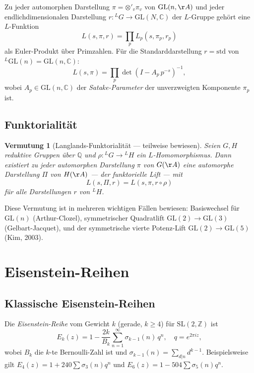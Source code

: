 \documentclass[12pt,a4paper]{amsart}
\newtheorem{conjecture}[theorem]{Vermutung}
\theoremstyle{definition}
\newcommand{\ZZ}{\mathbb{Z}}
\newcommand{\QQ}{\mathbb{Q}}
\newcommand{\CC}{\mathbb{C}}
\newcommand{\GL}{\mathrm{GL}}
\newcommand{\SL}{\mathrm{SL}}
\begin{document}
Zu jeder automorphen Darstellung $\pi = \otimes'_v \pi_v$ von $\GL(n,\AA)$ und
jeder endlichdimensionalen Darstellung $r: {}^L G \to \GL(N,\CC)$ der $L$-Gruppe
gehört eine $L$-Funktion
\[
L(s, \pi, r) = \prod_p L_p(s, \pi_p, r_p)
\]
als Euler-Produkt über Primzahlen. Für die Standarddarstellung $r = \mathrm{std}$
von ${}^L\GL(n) = \GL(n,\CC)$:
\[
L(s, \pi) = \prod_p \det\!\left(I - A_p\, p^{-s}\right)^{-1},
\]
wobei $A_p \in \GL(n,\CC)$ der \emph{Satake-Parameter} der unverzweigten Komponente
$\pi_p$ ist.

\subsection{Funktorialität}

\begin{conjecture}[Langlands-Funktorialität — teilweise bewiesen]
\label{verm:funktorialitaet}
Seien $G, H$ reduktive Gruppen über $\QQ$ und $\rho: {}^L G \to {}^L H$ ein
$L$-Homomorphismus. Dann existiert zu jeder automorphen Darstellung $\pi$ von
$G(\AA)$ eine automorphe Darstellung $\Pi$ von $H(\AA)$ — der \emph{funktori\-elle
Lift} — mit
\[
L(s, \Pi, r) = L(s, \pi, r \circ \rho)
\]
für alle Darstellungen $r$ von ${}^L H$.
\end{conjecture}

Diese Vermutung ist in mehreren wichtigen Fällen bewiesen: Basiswechsel für $\GL(n)$
(Arthur-Clozel), symmetrischer Quadratlift $\GL(2) \to \GL(3)$ (Gelbart-Jacquet),
und der symmetrische vierte Potenz-Lift $\GL(2) \to \GL(5)$ (Kim, 2003).

\section{Eisenstein-Reihen}
\label{sec:eisenstein}

\subsection{Klassische Eisenstein-Reihen}

Die \emph{Eisenstein-Reihe} vom Gewicht $k$ (gerade, $k \geq 4$) für $\SL(2,\ZZ)$
ist
\[
E_k(z) = 1 - \frac{2k}{B_k} \sum_{n=1}^\infty \sigma_{k-1}(n)\, q^n,
\quad q = e^{2\pi iz},
\]
wobei $B_k$ die $k$-te Bernoulli-Zahl ist und $\sigma_{k-1}(n) = \sum_{d|n} d^{k-1}$.
Beispielsweise gilt $E_4(z) = 1 + 240 \sum \sigma_3(n) q^n$ und
$E_6(z) = 1 - 504 \sum \sigma_5(n) q^n$.
\end{document}
